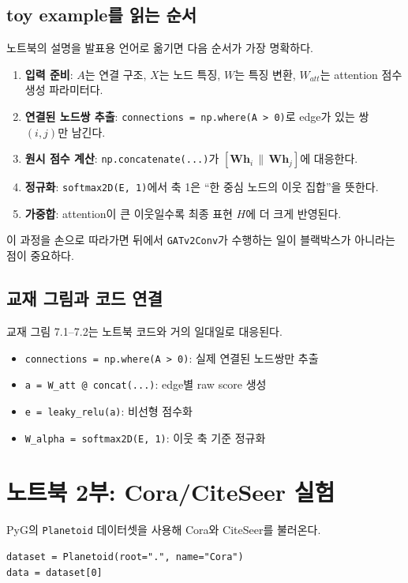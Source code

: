 \documentclass[11pt,a4paper]{article}
\begin{document}
\subsection*{toy example를 읽는 순서}
노트북의 설명을 발표용 언어로 옮기면 다음 순서가 가장 명확하다.
\begin{enumerate}[leftmargin=*]
  \item \textbf{입력 준비}: $A$는 연결 구조, $X$는 노드 특징, $W$는 특징 변환, $W_{att}$는 attention 점수 생성 파라미터다.
  \item \textbf{연결된 노드쌍 추출}: \texttt{connections = np.where(A > 0)}로 edge가 있는 쌍 $(i,j)$만 남긴다.
  \item \textbf{원시 점수 계산}: \texttt{np.concatenate(...)}가 $[\mathbf{W}\mathbf{h}_i \, \| \, \mathbf{W}\mathbf{h}_j]$에 대응한다.
  \item \textbf{정규화}: \texttt{softmax2D(E, 1)}에서 축 1은 ``한 중심 노드의 이웃 집합''을 뜻한다.
  \item \textbf{가중합}: attention이 큰 이웃일수록 최종 표현 $H$에 더 크게 반영된다.
\end{enumerate}

이 과정을 손으로 따라가면 뒤에서 \texttt{GATv2Conv}가 수행하는 일이 블랙박스가 아니라는 점이 중요하다.

\subsection*{교재 그림과 코드 연결}
교재 그림 7.1--7.2는 노트북 코드와 거의 일대일로 대응된다.
\begin{itemize}[leftmargin=*]
  \item \texttt{connections = np.where(A > 0)}: 실제 연결된 노드쌍만 추출
  \item \texttt{a = W\_att @ concat(...)}: edge별 raw score 생성
  \item \texttt{e = leaky\_relu(a)}: 비선형 점수화
  \item \texttt{W\_alpha = softmax2D(E, 1)}: 이웃 축 기준 정규화
\end{itemize}

\section{노트북 2부: Cora/CiteSeer 실험}

PyG의 \texttt{Planetoid} 데이터셋을 사용해 Cora와 CiteSeer를 불러온다.

\begin{lstlisting}
dataset = Planetoid(root=".", name="Cora")
data = dataset[0]
\end{lstlisting}
\end{document}
